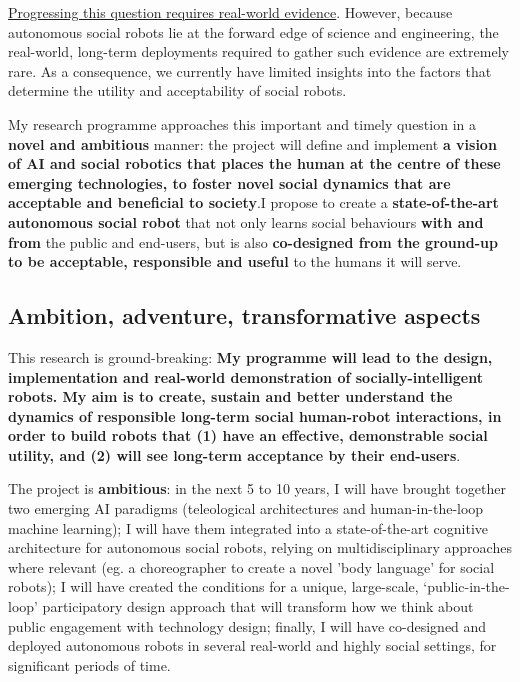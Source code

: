 \ul{Progressing this question requires real-world evidence}. However, because
autonomous social robots lie at the forward edge of science and engineering, the
real-world, long-term deployments required to gather such evidence are extremely
rare. As a consequence, we currently have limited insights into the factors that
determine the utility and acceptability of social robots.

My research programme approaches this important and timely question in a \textbf{novel and
ambitious} manner: the project will define and implement \textbf{a vision of AI
and social robotics that places the human at the centre of these emerging
technologies, to foster novel social dynamics that are acceptable and beneficial
to society}.I propose to create a \textbf{state-of-the-art autonomous social
robot} that not only learns social behaviours \textbf{with and from} the public
and end-users, but is also \textbf{co-designed from the ground-up to be
acceptable, responsible and useful} to the humans it will serve.





\subsection{Ambition, adventure, transformative aspects}

This research is ground-breaking: \textbf{My programme will lead to
the design, implementation and real-world demonstration of 
socially-intelligent robots.  My aim is to create, sustain and better understand
the dynamics of responsible long-term social human-robot interactions, in order
to build robots that (1) have an effective, demonstrable social utility, and (2)
will see long-term acceptance by their end-users}.


The project is \textbf{ambitious}: in the next 5 to 10 years, I will have
brought together two emerging AI paradigms (teleological architectures and
human-in-the-loop machine learning); I will have them integrated into a
state-of-the-art cognitive architecture for autonomous social robots, relying on
multidisciplinary approaches where relevant (eg. a choreographer to create a
novel 'body language' for social robots); I will have created the conditions for
a unique, large-scale, `public-in-the-loop' participatory design approach that
will transform how we think about public engagement with technology design;
finally, I will have co-designed and deployed autonomous robots in several
real-world and highly social settings, for significant periods of time.


